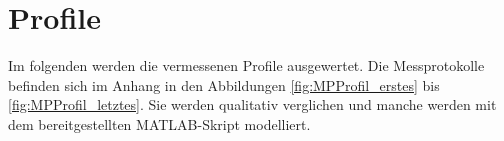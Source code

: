 
\section{Profile}

Im folgenden werden die vermessenen Profile ausgewertet. Die Messprotokolle befinden sich im Anhang in den Abbildungen \ref{fig:MPProfil_erstes} bis \ref{fig:MPProfil_letztes}. Sie werden qualitativ verglichen und manche werden mit dem bereitgestellten MATLAB-Skript modelliert.

